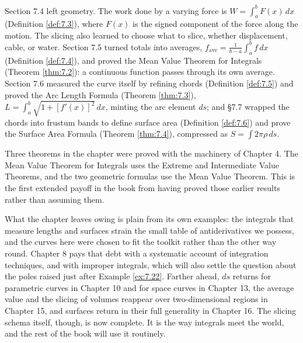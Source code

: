 \documentclass[a4paper,12pt,oneside]{memoir}
\begin{document}
Section 7.4 left geometry. The work done by a varying force is \(W = \int_a^b F(x)\,dx\) (Definition \ref{def:7.3}), where \(F(x)\) is the signed component of the force along the motion. The slicing also learned to choose what to slice, whether displacement, cable, or water. Section 7.5 turned totals into averages, \(f_{\text{ave}} = \frac{1}{b-a}\int_a^b f\,dx\) (Definition \ref{def:7.4}), and proved the Mean Value Theorem for Integrals (Theorem \ref{thm:7.2}): a continuous function passes through its own average. Section 7.6 measured the curve itself by refining chords (Definition \ref{def:7.5}) and proved the Arc Length Formula (Theorem \ref{thm:7.3}), \(L = \int_a^b \sqrt{1 + [f'(x)]^{2}}\,dx\), minting the arc element \(ds\); and §7.7 wrapped the chords into frustum bands to define surface area (Definition \ref{def:7.6}) and prove the Surface Area Formula (Theorem \ref{thm:7.4}), compressed as \(S = \int 2\pi \rho\,ds\).

Three theorems in the chapter were proved with the machinery of Chapter 4. The Mean Value Theorem for Integrals uses the Extreme and Intermediate Value Theorems, and the two geometric formulas use the Mean Value Theorem. This is the first extended payoff in the book from having proved those earlier results rather than assuming them.

What the chapter leaves owing is plain from its own examples: the integrals that measure lengths and surfaces strain the small table of antiderivatives we possess, and the curves here were chosen to fit the toolkit rather than the other way round. Chapter 8 pays that debt with a systematic account of integration techniques, and with improper integrals, which will also settle the question about the poles raised just after Example \ref{ex:7.22}. Farther ahead, \(ds\) returns for parametric curves in Chapter 10 and for space curves in Chapter 13, the average value and the slicing of volumes reappear over two-dimensional regions in Chapter 15, and surfaces return in their full generality in Chapter 16. The slicing schema itself, though, is now complete. It is the way integrals meet the world, and the rest of the book will use it routinely.
\end{document}
